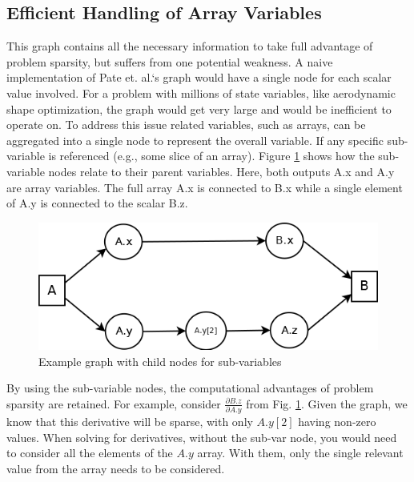 \documentclass[]{aiaa-tc} %
\begin{document}
    \subsection{Efficient Handling of Array Variables}
        This graph contains all the necessary information to take full advantage of problem sparsity, 
        but suffers from one potential weakness. A naive implementation of Pate et. al.`s graph would have a 
        single node for each scalar value involved. For a problem with millions of state variables, like 
        aerodynamic shape optimization, the graph would get very large and would be inefficient to operate on. 
        To address this issue related variables, such as arrays, can be aggregated into a single node to
        represent the overall variable. If any specific sub-variable is referenced 
        (e.g., some slice of an array). Figure \ref{fig:subvars} shows how the sub-variable nodes relate to their parent variables. Here,
        both outputs A.x and A.y are array variables. The full array A.x is connected to B.x while a single element
        of A.y is connected to the scalar B.z.

        \begin{figure}[!htb]\begin{center}
          \includegraphics[width=.8\textwidth]{images/Graph1}
          \caption{ Example graph with child nodes for sub-variables \label{fig:subvars}}
        \end{center}\end{figure}

        By using the sub-variable nodes, the computational advantages of problem sparsity are retained. For example, 
        consider $\frac{\partial B.z}{\partial A.y}$ from Fig. \ref{fig:subvars}. Given the graph, we know that
        this derivative will be sparse, with only $A.y[2]$ having non-zero values. When solving for derivatives, 
        without the sub-var node, you would need to consider all the elements of the $A.y$ array. With them, only 
        the single relevant value from the array needs to be considered. 
\end{document}
